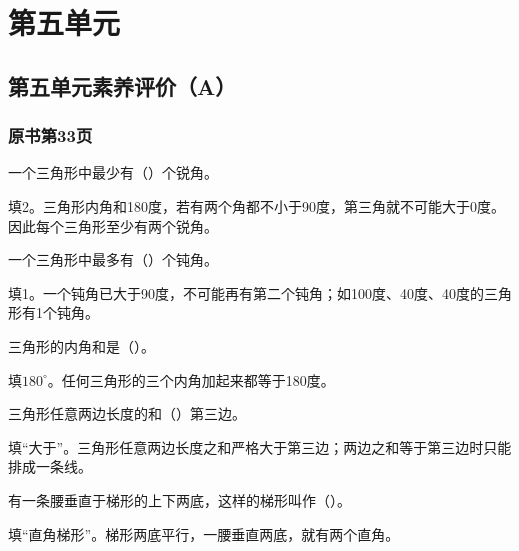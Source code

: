 \chapter{第五单元}


\section{第五单元素养评价（A）}



\subsection*{原书第33页}

一个三角形中最少有（\hspace{1.8em}）个锐角。\par
\begin{BookAnswer}
填2。三角形内角和180度，若有两个角都不小于90度，第三角就不可能大于0度。因此每个三角形至少有两个锐角。
\end{BookAnswer}

一个三角形中最多有（\hspace{1.8em}）个钝角。\par
\begin{BookAnswer}
填1。一个钝角已大于90度，不可能再有第二个钝角；如100度、40度、40度的三角形有1个钝角。
\end{BookAnswer}

三角形的内角和是（\hspace{1.8em}）。\par
\begin{BookAnswer}
填\(180^\circ\)。任何三角形的三个内角加起来都等于180度。
\end{BookAnswer}

三角形任意两边长度的和（\hspace{1.8em}）第三边。\par
\begin{BookAnswer}
填“大于”。三角形任意两边长度之和严格大于第三边；两边之和等于第三边时只能排成一条线。
\end{BookAnswer}

有一条腰垂直于梯形的上下两底，这样的梯形叫作（\hspace{1.8em}）。\par
\begin{BookAnswer}
填“直角梯形”。梯形两底平行，一腰垂直两底，就有两个直角。
\end{BookAnswer}

